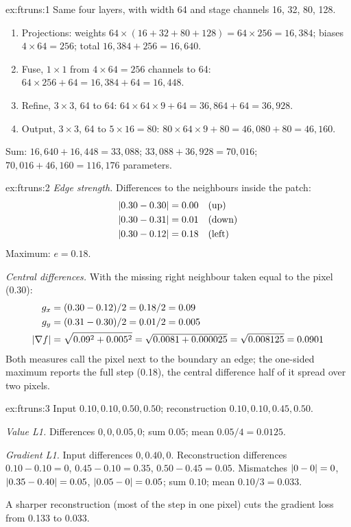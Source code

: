 
\begin{solution}{ex:ftruns:1}
Same four layers, with width 64 and stage channels 16, 32, 80, 128.
\begin{enumerate}
\item Projections: weights $64 \times (16 + 32 + 80 + 128) = 64 \times 256 = 16{,}384$; biases $4 \times 64 = 256$;
  total $16{,}384 + 256 = 16{,}640$.
\item Fuse, $1 \times 1$ from $4 \times 64 = 256$ channels to 64: $64 \times 256 + 64 = 16{,}384 + 64 = 16{,}448$.
\item Refine, $3 \times 3$, 64 to 64: $64 \times 64 \times 9 + 64 = 36{,}864 + 64 = 36{,}928$.
\item Output, $3 \times 3$, 64 to $5 \times 16 = 80$: $80 \times 64 \times 9 + 80 = 46{,}080 + 80 = 46{,}160$.
\end{enumerate}
Sum: $16{,}640 + 16{,}448 = 33{,}088$; $33{,}088 + 36{,}928 = 70{,}016$; $70{,}016 + 46{,}160 = 116{,}176$ parameters.
\end{solution}

\begin{solution}{ex:ftruns:2}
\emph{Edge strength.} Differences to the neighbours inside the patch:
\begin{align*}
\left\lvert 0.30 - 0.30 \right\rvert &= 0.00 \quad\text{(up)}\\
\left\lvert 0.30 - 0.31 \right\rvert &= 0.01 \quad\text{(down)}\\
\left\lvert 0.30 - 0.12 \right\rvert &= 0.18 \quad\text{(left)}
\end{align*}
Maximum: $e = 0.18$.

\emph{Central differences.} With the missing right neighbour taken equal to the pixel (0.30):
\begin{align*}
g_x &= (0.30 - 0.12) / 2 = 0.18 / 2 = 0.09\\
g_y &= (0.31 - 0.30) / 2 = 0.01 / 2 = 0.005\\
\left\lvert \nabla f \right\rvert &= \sqrt{0.09^2 + 0.005^2} = \sqrt{0.0081 + 0.000025} = \sqrt{0.008125} = 0.0901
\end{align*}
Both measures call the pixel next to the boundary an edge; the one-sided maximum reports the full step (0.18), the
central difference half of it spread over two pixels.
\end{solution}

\begin{solution}{ex:ftruns:3}
Input $0.10, 0.10, 0.50, 0.50$; reconstruction $0.10, 0.10, 0.45, 0.50$.

\emph{Value L1.} Differences $0, 0, 0.05, 0$; sum $0.05$; mean $0.05 / 4 = 0.0125$.

\emph{Gradient L1.} Input differences $0, 0.40, 0$. Reconstruction differences $0.10 - 0.10 = 0$,
$0.45 - 0.10 = 0.35$, $0.50 - 0.45 = 0.05$. Mismatches $\left\lvert 0 - 0 \right\rvert = 0$, $\left\lvert 0.35 - 0.40 \right\rvert = 0.05$,
$\left\lvert 0.05 - 0 \right\rvert = 0.05$; sum $0.10$; mean $0.10 / 3 = 0.033$.

A sharper reconstruction (most of the step in one pixel) cuts the gradient loss from 0.133 to 0.033.
\end{solution}

